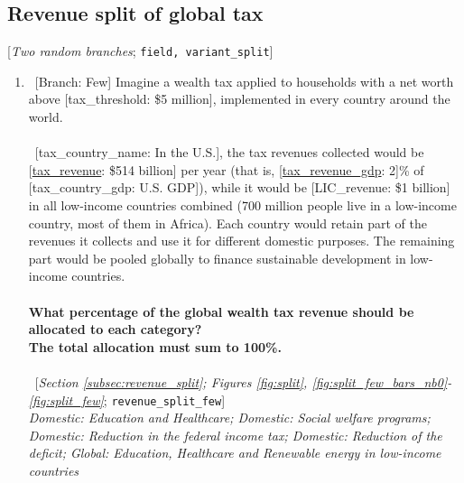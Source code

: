  \subsection*{Revenue split of global tax} 
 [\textit{Two random branches};  \verb|field, variant_split|] 
 \begin{enumerate}[resume] 
\item ~[Branch: Few] \label{q:revenue_split_few} Imagine a wealth tax applied to households with a net worth above [tax\_threshold: \$5 million], implemented in every country around the world.
~\\\\ 
~[tax\_country\_name: In the U.S.], the tax revenues collected would be [\hyperlink{tab_features}{tax\_revenue}: \$514 billion] per year (that is, [\hyperlink{tab_features}{tax\_revenue\_gdp}: 2]\% of [tax\_country\_gdp: U.S. GDP]), while it would be [LIC\_revenue: \$1 billion] in all low-income countries combined (700 million people live in a low-income country, most of them in Africa).
Each country would retain part of the revenues it collects and use it for different domestic purposes. The remaining part would be pooled globally to finance sustainable development in low-income countries.
~\\\\\textbf{What percentage of the global wealth tax revenue should be allocated to each category?} \\\textbf{The total allocation must sum to 100\%.}\\\\ 
~[\textit{Section \ref{subsec:revenue_split}; Figures \ref{fig:split}, \ref{fig:split_few_bars_nb0}-\ref{fig:split_few}}; 
\verb|revenue_split_few|]
  \\ \textit{Domestic: Education and Healthcare; Domestic: Social welfare programs; Domestic: Reduction in the federal income tax; Domestic: Reduction of the deficit; Global: Education, Healthcare and Renewable energy in low-income countries}


\end{enumerate}
